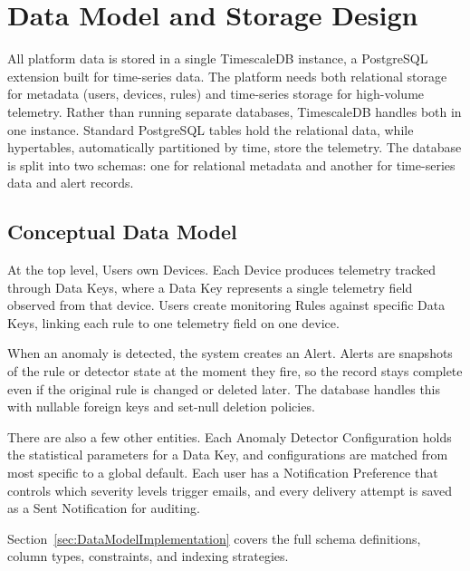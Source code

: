 
\section{Data Model and Storage Design}
\label{sec:ProposedModelDataModelAndStorageDesign}

All platform data is stored in a single TimescaleDB instance, a PostgreSQL extension built for time-series data. The platform needs both relational storage for metadata (users, devices, rules) and time-series storage for high-volume telemetry. Rather than running separate databases, TimescaleDB handles both in one instance. Standard PostgreSQL tables hold the relational data, while hypertables, automatically partitioned by time, store the telemetry. The database is split into two schemas: one for relational metadata and another for time-series data and alert records.

\subsection{Conceptual Data Model}
At the top level, Users own Devices. Each Device produces telemetry tracked through Data Keys, where a Data Key represents a single telemetry field observed from that device. Users create monitoring Rules against specific Data Keys, linking each rule to one telemetry field on one device.

When an anomaly is detected, the system creates an Alert. Alerts are snapshots of the rule or detector state at the moment they fire, so the record stays complete even if the original rule is changed or deleted later. The database handles this with nullable foreign keys and set-null deletion policies.

There are also a few other entities. Each Anomaly Detector Configuration holds the statistical parameters for a Data Key, and configurations are matched from most specific to a global default. Each user has a Notification Preference that controls which severity levels trigger emails, and every delivery attempt is saved as a Sent Notification for auditing.

Section~\ref{sec:DataModelImplementation} covers the full schema definitions, column types, constraints, and indexing strategies.

